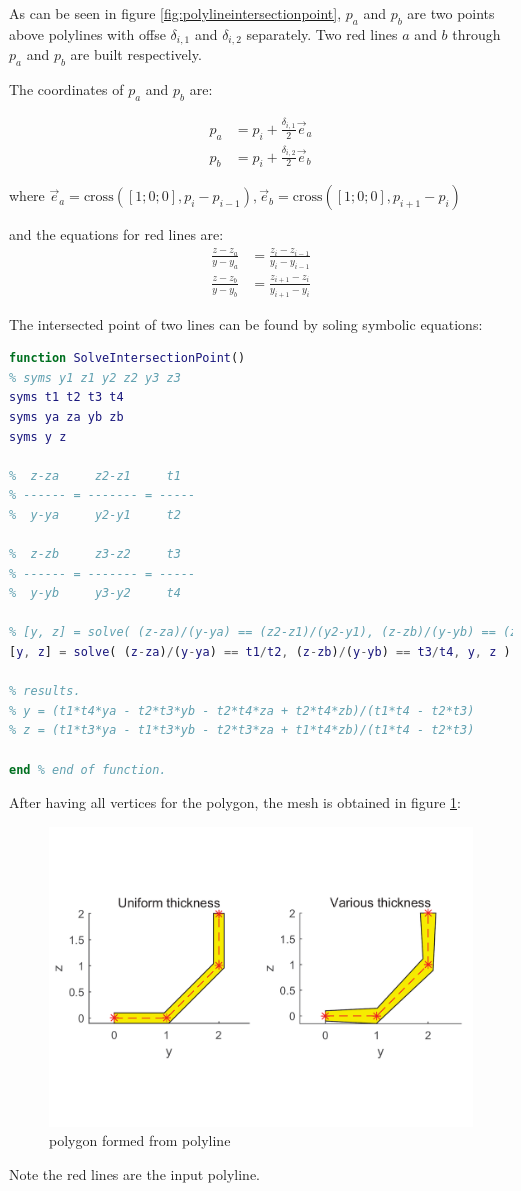 As can be seen in figure \ref{fig:polylineintersectionpoint}, $ p_a $ and $ p_b $ are two points above polylines with offse $ \delta_{i,1} $ and $ \delta_{i,2} $ separately. Two red lines $ a $ and $ b $ through $ p_a $ and $ p_b $  are built respectively.

The coordinates of $ p_a $ and $ p_b $ are:

\begin{align*}
p_a &= p_i + \frac{\delta_{i,1}}{2} \vec{e}_a \\
p_b &= p_i + \frac{\delta_{i,2}}{2} \vec{e}_b
\end{align*}

where $ \vec{e}_a = \mathrm{cross}([1;0;0], p_{i}-p_{i-1} ), \vec{e}_b = \mathrm{cross}([1;0;0], p_{i+1}-p_{i} )  $

and the equations for red lines are:
\begin{align*}
	\frac{z-z_a}{y-y_a} &= \frac{z_{i}-z_{i-1}}{y_{i}-y_{i-1}} \\
	\frac{z-z_b}{y-y_b} &= \frac{z_{i+1}-z_{i}}{y_{i+1}-y_{i}}
\end{align*}

The intersected point of two lines can be found by soling symbolic equations:

\begin{lstlisting}[language=matlab]
function SolveIntersectionPoint()
% syms y1 z1 y2 z2 y3 z3
syms t1 t2 t3 t4
syms ya za yb zb
syms y z

%  z-za     z2-z1     t1
% ------ = ------- = -----
%  y-ya     y2-y1     t2

%  z-zb     z3-z2     t3
% ------ = ------- = -----
%  y-yb     y3-y2     t4

% [y, z] = solve( (z-za)/(y-ya) == (z2-z1)/(y2-y1), (z-zb)/(y-yb) == (z3-z2)/(y3-y2), y, z );
[y, z] = solve( (z-za)/(y-ya) == t1/t2, (z-zb)/(y-yb) == t3/t4, y, z )

% results.
% y = (t1*t4*ya - t2*t3*yb - t2*t4*za + t2*t4*zb)/(t1*t4 - t2*t3)
% z = (t1*t3*ya - t1*t3*yb - t2*t3*za + t1*t4*zb)/(t1*t4 - t2*t3)

end % end of function.
\end{lstlisting}

After having all vertices for the polygon, the mesh is obtained in figure \ref{fig:polyline2polygon}:

\begin{figure}[h!]
\centering
\includegraphics[width=0.7\linewidth]{Figures/polyline2Polygon}
\caption{polygon formed from polyline}
\label{fig:polyline2polygon}
\end{figure}

Note the red lines are the input polyline.